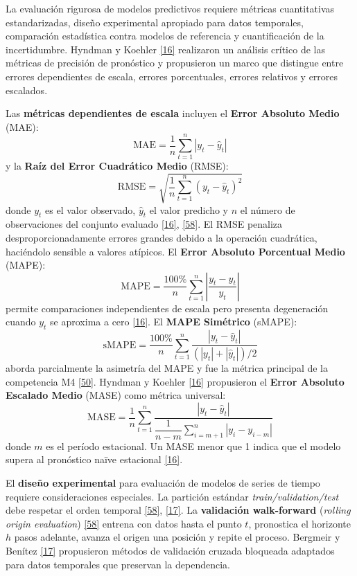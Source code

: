\documentclass[12pt,letterpaper]{report}
\newcommand{\cita}[1]{\hyperref[bib:#1]{[#1]}}
\begin{document}
La evaluación rigurosa de modelos predictivos requiere métricas cuantitativas estandarizadas, diseño experimental apropiado para datos temporales, comparación estadística contra modelos de referencia y cuantificación de la incertidumbre. Hyndman y Koehler \cita{16} realizaron un análisis crítico de las métricas de precisión de pronóstico y propusieron un marco que distingue entre errores dependientes de escala, errores porcentuales, errores relativos y errores escalados.

Las \textbf{métricas dependientes de escala} incluyen el \textbf{Error Absoluto Medio} (MAE):
\begin{equation}
    \text{MAE} = \frac{1}{n}\sum_{t=1}^{n}|y_t - \hat{y}_t|
\end{equation}
y la \textbf{Raíz del Error Cuadrático Medio} (RMSE):
\begin{equation}
    \text{RMSE} = \sqrt{\frac{1}{n}\sum_{t=1}^{n}(y_t - \hat{y}_t)^2}
\end{equation}
donde $y_t$ es el valor observado, $\hat{y}_t$ el valor predicho y $n$ el número de observaciones del conjunto evaluado \cita{16}, \cita{58}. El RMSE penaliza desproporcionadamente errores grandes debido a la operación cuadrática, haciéndolo sensible a valores atípicos. El \textbf{Error Absoluto Porcentual Medio} (MAPE):
\begin{equation}
    \text{MAPE} = \frac{100\%}{n}\sum_{t=1}^{n}\left|\frac{y_t - \hat{y}_t}{y_t}\right|
\end{equation}
permite comparaciones independientes de escala pero presenta degeneración cuando $y_t$ se aproxima a cero \cita{16}. El \textbf{MAPE Simétrico} (sMAPE):
\begin{equation}
    \text{sMAPE} = \frac{100\%}{n}\sum_{t=1}^{n}\frac{|y_t - \hat{y}_t|}{(|y_t| + |\hat{y}_t|)/2}
\end{equation}
aborda parcialmente la asimetría del MAPE y fue la métrica principal de la competencia M4 \cita{50}. Hyndman y Koehler \cita{16} propusieron el \textbf{Error Absoluto Escalado Medio} (MASE) como métrica universal:
\begin{equation}
    \text{MASE} = \frac{1}{n}\sum_{t=1}^{n}\frac{|y_t - \hat{y}_t|}{\dfrac{1}{n-m}\displaystyle\sum_{i=m+1}^{n}|y_i - y_{i-m}|}
\end{equation}
donde $m$ es el período estacional. Un MASE menor que 1 indica que el modelo supera al pronóstico naïve estacional \cita{16}.

El \textbf{diseño experimental} para evaluación de modelos de series de tiempo requiere consideraciones especiales. La partición estándar \textit{train/validation/test} debe respetar el orden temporal \cita{58}, \cita{17}. La \textbf{validación walk-forward} (\textit{rolling origin evaluation}) \cita{58} entrena con datos hasta el punto $t$, pronostica el horizonte $h$ pasos adelante, avanza el origen una posición y repite el proceso. Bergmeir y Benítez \cita{17} propusieron métodos de validación cruzada bloqueada adaptados para datos temporales que preservan la dependencia.
\end{document}
